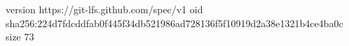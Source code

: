 version https://git-lfs.github.com/spec/v1
oid sha256:224d7fdcddfab0f445f34db521986ad728136f5f10919d2a38e1321b4ce4ba0c
size 73
